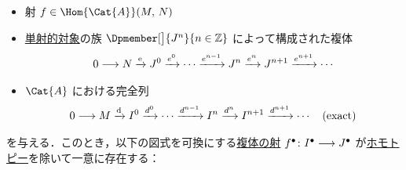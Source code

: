 \documentclass[algtopo_main]{subfiles}
\begin{document}
\begin{mylem}[label=lem:RDF-1]{}
    \begin{itemize}
        \item 射 $f \in \Hom{\Cat{A}}(M,\, N)$
        \item \hyperref[def:inj-mod]{単射的対象}の族 $\Dpmember[\big]{J^n}{n \in \mathbb{Z}}$ によって構成された複体
        \begin{align}
            0 \longrightarrow N \xrightarrow{\mathrm{e}} J^0 \xrightarrow{e^0} \cdots \xrightarrow{e^{n-1}} J^n \xrightarrow{e^n} J^{n+1} \xrightarrow{e^{n+1}} \cdots
        \end{align}
        \item $\Cat{A}$ における完全列
        \begin{align}
            0 \longrightarrow M \xrightarrow{\mathrm{d}} I^0 \xrightarrow{d^0} \cdots \xrightarrow{d^{n-1}} I^n \xrightarrow{d^n} I^{n+1} \xrightarrow{d^{n+1}} \cdots \quad (\text{exact})
        \end{align}
    \end{itemize}
    を与える．このとき，以下の図式を可換にする\hyperref[def:chain-morphism]{複体の射} $f^\bullet \colon I^\bullet \longrightarrow J^\bullet$ が\hyperref[def:chain-homotopy]{ホモトピー}を除いて一意に存在する：
    \begin{center}
    \end{center}
\end{mylem}
\end{document}

